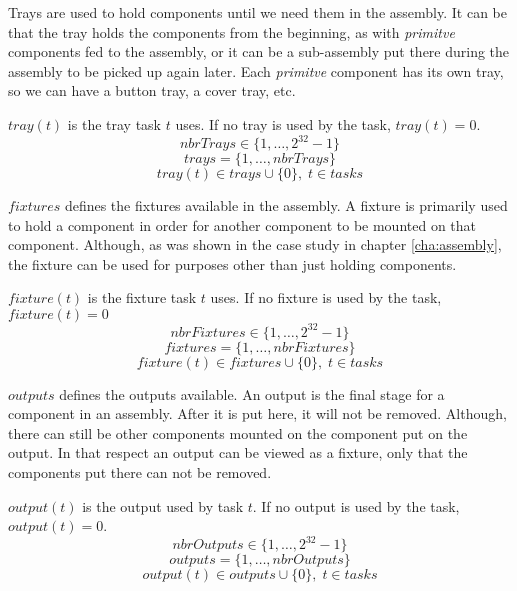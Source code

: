   \noindent Trays are used to hold components until we need them in the assembly. It can be that the tray holds the components from the beginning, as with \emph{primitve} components fed to the assembly, or it can be a sub-assembly put there during the assembly to be picked up again later. Each \emph{primitve} component has its own tray, so we can have a button tray, a cover tray, etc.
  
  $tray(t)$ is the tray task $t$ uses. If no tray is used by the task, $tray(t) = 0$.
 \begin{equation}\label{eq:4}
 nbrTrays \in \{1 , \ldots , 2^{32}-1\}
 \end{equation}
 \begin{equation}\label{eq:14}
 trays = \{1 , \ldots , nbrTrays\}
 \end{equation}
 \begin{equation}\label{eq:22}
 tray(t) \in trays \cup \{0\}, \; t \in tasks
 \end{equation}

  \noindent $fixtures$ defines the fixtures available in the assembly. A fixture is primarily used to hold a component in order for another component to be mounted on that component. Although, as was shown in the case study in chapter \ref{cha:assembly}, the fixture can be used for purposes other than just holding components.
  
  $fixture(t)$ is the fixture task $t$ uses. If no fixture is used by the task, $fixture(t) = 0$
 \begin{equation}\label{eq:5}
 nbrFixtures \in \{1 , \ldots , 2^{32}-1\}
 \end{equation}
 \begin{equation}\label{eq:15}
 fixtures = \{1 , \ldots , nbrFixtures\}
 \end{equation}
 \begin{equation}\label{eq:24}
 fixture(t) \in fixtures \cup \{0\}, \; t \in tasks
 \end{equation}

  \noindent $outputs$ defines the outputs available. An output is the final stage for a component in an assembly. After it is put here, it will not be removed. Although, there can still be other components mounted on the component put on the output. In that respect an output can be viewed as a fixture, only that the components put there can not be removed.
 
 $output(t)$ is the output used by task $t$. If no output is used by the task, $output(t) = 0$.
 \begin{equation}\label{eq:7}
 nbrOutputs \in \{1 , \ldots , 2^{32}-1\}
 \end{equation}
 \begin{equation}\label{eq:16}
 outputs = \{1 , \ldots , nbrOutputs\}
 \end{equation}
 \begin{equation}\label{eq:23}
 output(t) \in outputs \cup \{0\}, \; t \in tasks
 \end{equation}

